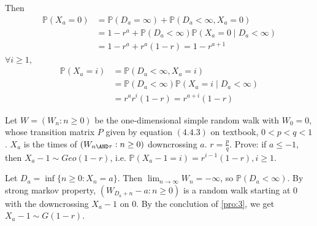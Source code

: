 \documentclass{ctexart}
\begin{document}
\begin{solution}
\begin{enumerate}
      Then \[
        \begin{aligned}
          \mathbb{P}(X_a=0) & =\mathbb{P}(D_a=\infty) + \mathbb{P}(D_a < \infty, X_a=0)            \\
                            & =1-r^a + \mathbb{P}(D_a < \infty)\mathbb{P}(X_a=0 \mid D_a < \infty) \\
                            & =1-r^a + r^a(1-r)=1-r^{a + 1}
        \end{aligned}
      \]
      \(\forall i \geq 1\),
      \[
        \begin{aligned}
          \mathbb{P}(X_a=i) & =\mathbb{P}(D_a< \infty,X_a=i)                                    \\
                            & =    \mathbb{P}(D_a< \infty)\mathbb{P}(X_a = i \mid D_a < \infty) \\
                            & =r^ar^i(1-r)=r^{a + i}(1-r)
        \end{aligned}
      \]
  \end{enumerate}
\end{solution}
\begin{problem}\label{pro:4}
  Let \(W=(W_n:n \geq 0)\) be the one-dimensional simple random walk with \(W_0=0\), whose transition matrix \(P\) given by equation \((4.4.3)\)
  on textbook, \(0< p<q<1\).
  \(X_a\) is the times of \((W_{n \AND \tau}:n \geq 0)\) downcrossing \(a\).
  \(r=\frac{p}{q}\).
  Prove: if \(a \leq -1\), then \(X_a-1 \sim Geo(1-r)\), i.e. \(\mathbb{P}(X_a-1=i)=r^{i-1}(1-r),i \geq 1\).
\end{problem}
\begin{solution}
Let \(D_a= \inf \{n \geq 0: X_n=a\}\). Then \(\lim_{n \to \infty}W_n = -\infty\), so \(\mathbb{P}(D_a < \infty)\). 
By strong markov property, \((W_{D_a + n}-a: n \geq 0)\) is a random walk starting at \(0\) with the downcrossing \(X_a-1\) on \(0\). 
By the conclution of \ref{pro:3}, we get \(X_{a} -1\sim G(1-r)\).

\end{solution}
\end{document}
